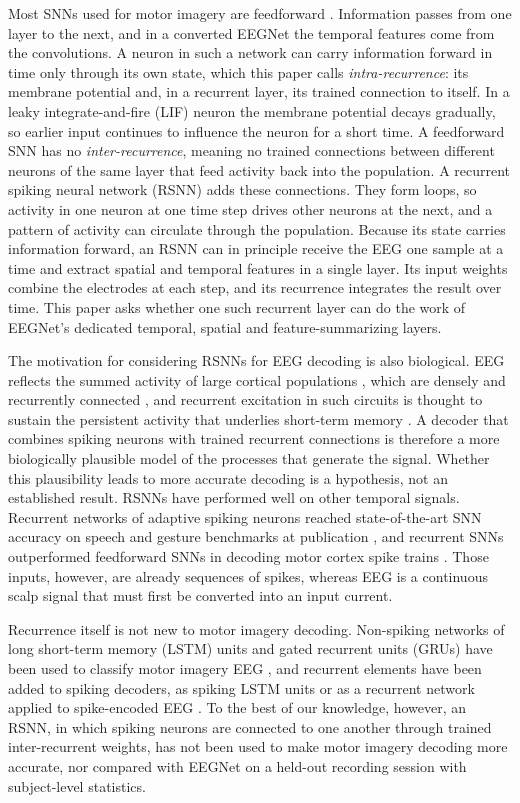 \documentclass[conference]{IEEEtran}
\begin{document}
Most SNNs used for motor imagery are feedforward \cite{liao2025,chen2026}. Information passes from one layer to the next, and in a converted EEGNet the temporal features come from the convolutions. A neuron in such a network can carry information forward in time only through its own state, which this paper calls \emph{intra-recurrence}: its membrane potential and, in a recurrent layer, its trained connection to itself. In a leaky integrate-and-fire (LIF) neuron the membrane potential decays gradually, so earlier input continues to influence the neuron for a short time. A feedforward SNN has no \emph{inter-recurrence}, meaning no trained connections between different neurons of the same layer that feed activity back into the population. A recurrent spiking neural network (RSNN) adds these connections. They form loops, so activity in one neuron at one time step drives other neurons at the next, and a pattern of activity can circulate through the population. Because its state carries information forward, an RSNN can in principle receive the EEG one sample at a time and extract spatial and temporal features in a single layer. Its input weights combine the electrodes at each step, and its recurrence integrates the result over time. This paper asks whether one such recurrent layer can do the work of EEGNet's dedicated temporal, spatial and feature-summarizing layers.

The motivation for considering RSNNs for EEG decoding is also biological. EEG reflects the summed activity of large cortical populations \cite{buzsaki2012}, which are densely and recurrently connected \cite{douglas2007}, and recurrent excitation in such circuits is thought to sustain the persistent activity that underlies short-term memory \cite{wang2001}. A decoder that combines spiking neurons with trained recurrent connections is therefore a more biologically plausible model of the processes that generate the signal. Whether this plausibility leads to more accurate decoding is a hypothesis, not an established result. RSNNs have performed well on other temporal signals. Recurrent networks of adaptive spiking neurons reached state-of-the-art SNN accuracy on speech and gesture benchmarks at publication \cite{yin2021}, and recurrent SNNs outperformed feedforward SNNs in decoding motor cortex spike trains \cite{liu2025,liu2024}. Those inputs, however, are already sequences of spikes, whereas EEG is a continuous scalp signal that must first be converted into an input current.

Recurrence itself is not new to motor imagery decoding. Non-spiking networks of long short-term memory (LSTM) units and gated recurrent units (GRUs) \cite{hochreiter1997,cho2014} have been used to classify motor imagery EEG \cite{luo2018}, and recurrent elements have been added to spiking decoders, as spiking LSTM units \cite{gong2023} or as a recurrent network applied to spike-encoded EEG \cite{lim2025}. To the best of our knowledge, however, an RSNN, in which spiking neurons are connected to one another through trained inter-recurrent weights, has not been used to make motor imagery decoding more accurate, nor compared with EEGNet on a held-out recording session with subject-level statistics.
\end{document}
